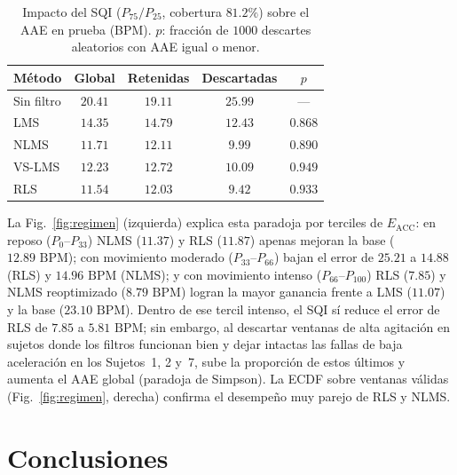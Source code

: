 \documentclass[conference]{IEEEtran}
\newcommand{\secUC}[1]{#1}
\newcommand{\secUC}[1]{\texorpdfstring{\MakeUppercase{#1}}{#1}}
\begin{document}
\begin{table}[!t]
    \centering
    \caption{Impacto del SQI ($P_{75}/P_{25}$, cobertura $81.2\%$) sobre el AAE en prueba (BPM). $p$: fracción de $1000$ descartes aleatorios con AAE igual o menor.}
    \label{tab:sqi}
    \footnotesize
    \setlength{\tabcolsep}{3pt}
    \begin{tabular}{lcccc}
        \toprule
        \textbf{Método} & \textbf{Global} & \textbf{Retenidas} & \textbf{Descartadas} & $p$ \\
        \midrule
        Sin filtro & $20.41$ & $19.11$ & $25.99$ & --- \\
        LMS & $14.35$ & $14.79$ & $12.43$ & $0.868$ \\
        NLMS & $11.71$ & $12.11$ & $9.99$ & $0.890$ \\
        VS-LMS & $12.23$ & $12.72$ & $10.09$ & $0.949$ \\
        RLS & $11.54$ & $12.03$ & $9.42$ & $0.933$ \\
        \bottomrule
    \end{tabular}
\end{table}

La Fig.~\ref{fig:regimen} (izquierda) explica esta paradoja por terciles de $E_{\text{ACC}}$: en reposo ($P_0$--$P_{33}$) NLMS ($11.37$) y RLS ($11.87$) apenas mejoran la base ($12.89\text{ BPM}$); con movimiento moderado ($P_{33}$--$P_{66}$) bajan el error de $25.21$ a $14.88$ (RLS) y $14.96\text{ BPM}$ (NLMS); y con movimiento intenso ($P_{66}$--$P_{100}$) RLS ($7.85$) y NLMS reoptimizado ($8.79\text{ BPM}$) logran la mayor ganancia frente a LMS ($11.07$) y la base ($23.10\text{ BPM}$). Dentro de ese tercil intenso, el SQI sí reduce el error de RLS de $7.85$ a $5.81\text{ BPM}$; sin embargo, al descartar ventanas de alta agitación en sujetos donde los filtros funcionan bien y dejar intactas las fallas de baja aceleración en los Sujetos~1, 2 y~7, sube la proporción de estos últimos y aumenta el AAE global (paradoja de Simpson). La ECDF sobre ventanas válidas (Fig.~\ref{fig:regimen}, derecha) confirma el desempeño muy parejo de RLS y NLMS.

\FloatBarrier
\section{\secUC{Conclusiones}}
\label{sec:conc}
\end{document}
